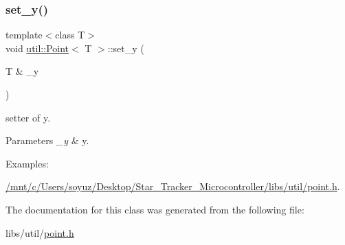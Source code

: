 \subsubsection{\texorpdfstring{set\+\_\+y()}{set\_y()}}
{\footnotesize\ttfamily template$<$class T$>$ \\
void \hyperlink{classutil_1_1Point}{util\+::\+Point}$<$ T $>$\+::set\+\_\+y (\begin{DoxyParamCaption}\item[{T \&}]{\+\_\+y }\end{DoxyParamCaption})\hspace{0.3cm}{\ttfamily [inline]}}



setter of y. 


\begin{DoxyParams}{Parameters}
{\em \+\_\+y} & y. \\
\hline
\end{DoxyParams}
\begin{Desc}
\item[Examples\+: ]\par
\hyperlink{_2mnt_2c_2Users_2soyuz_2Desktop_2Star_Tracker_Microcontroller_2libs_2util_2point_8h-example}{/mnt/c/\+Users/soyuz/\+Desktop/\+Star\+\_\+\+Tracker\+\_\+\+Microcontroller/libs/util/point.\+h}.\end{Desc}


The documentation for this class was generated from the following file\+:\begin{DoxyCompactItemize}
\item 
libs/util/\hyperlink{point_8h}{point.\+h}\end{DoxyCompactItemize}
